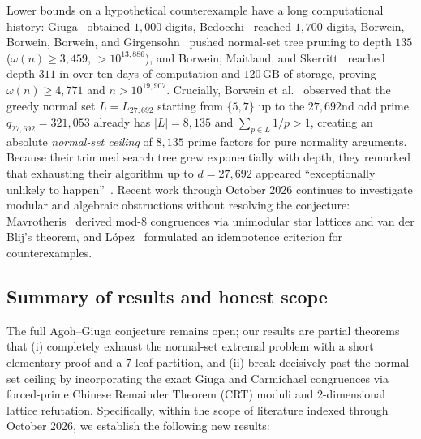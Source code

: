 \documentclass[11pt]{article}
\theoremstyle{remark}
\begin{document}
Lower bounds on a hypothetical counterexample have a long computational history:
Giuga~\cite{Giuga1950} obtained $1{,}000$ digits, Bedocchi~\cite{Bedocchi1985}
reached $1{,}700$ digits, Borwein, Borwein, Borwein, and
Girgensohn~\cite{Borwein_1996} pushed normal-set tree pruning to depth $135$
($\omega(n) \ge 3{,}459$, $>10^{13{,}886}$), and Borwein, Maitland, and
Skerritt~\cite{DBLP:journals/int/BorweinMS13} reached depth $311$ in over ten
days of computation and $120\,\mathrm{GB}$ of storage, proving
$\omega(n) \ge 4{,}771$ and $n > 10^{19{,}907}$. Crucially, Borwein et
al.~\cite{Borwein_1996,DBLP:journals/int/BorweinMS13} observed that the greedy
normal set $L = L_{27,692}$ starting from $\{5,7\}$ up to the $27{,}692$nd odd
prime $q_{27,692} = 321{,}053$ already has $|L| = 8{,}135$ and
$\sum_{p\in L} 1/p > 1$, creating an absolute \emph{normal-set ceiling} of
$8{,}135$ prime factors for pure normality arguments. Because their trimmed
search tree grew exponentially with depth, they remarked that exhausting their
algorithm up to $d = 27{,}692$ appeared ``exceptionally unlikely to
happen''~\cite[p.~7]{DBLP:journals/int/BorweinMS13}. Recent work through
October 2026 continues to investigate modular and algebraic obstructions without
resolving the conjecture: Mavrotheris~\cite{Mavrotheris2026} derived mod-$8$
congruences via unimodular star lattices and van der Blij's theorem, and
L\'opez~\cite{Lopez2026} formulated an idempotence criterion for
counterexamples.

\subsection*{Summary of results and honest scope}

The full Agoh--Giuga conjecture remains open; our results are partial theorems
that (i) completely exhaust the normal-set extremal problem with a short
elementary proof and a $7$-leaf partition, and (ii) break decisively past the
normal-set ceiling by incorporating the exact Giuga and Carmichael congruences
via forced-prime Chinese Remainder Theorem (CRT) moduli and $2$-dimensional
lattice refutation. Specifically, within the scope of literature indexed through
October 2026, we establish the following new results:
\end{document}
